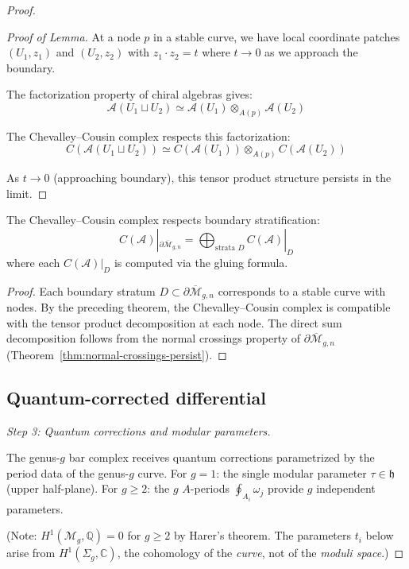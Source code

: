 \begin{proof}
\begin{proof}[Proof of Lemma]
At a node $p$ in a stable curve, we have local coordinate patches $(U_1, z_1)$ and
$(U_2, z_2)$ with $z_1 \cdot z_2 = t$ where $t \to 0$ as we approach the boundary.

The factorization property of chiral algebras gives:
\[\mathcal{A}(U_1 \sqcup U_2) \simeq \mathcal{A}(U_1) \otimes_{A(p)} \mathcal{A}(U_2)\]

The Chevalley--Cousin complex respects this factorization:
\[C(\mathcal{A}(U_1 \sqcup U_2)) \simeq C(\mathcal{A}(U_1)) \otimes_{A(p)} C(\mathcal{A}(U_2))\]

As $t \to 0$ (approaching boundary), this tensor product structure persists in the limit.
\end{proof}

\begin{corollary}\label{cor:CC-at-boundary}
The Chevalley--Cousin complex respects boundary stratification:
\[C(\mathcal{A})|_{\partial \overline{\mathcal{M}}_{g,n}} = \bigoplus_{\text{strata } D} C(\mathcal{A})|_D\]
where each $C(\mathcal{A})|_D$ is computed via the gluing formula.
\end{corollary}
\begin{proof}
Each boundary stratum $D \subset \partial\overline{\mathcal{M}}_{g,n}$ corresponds to a stable curve with nodes. By the preceding theorem, the Chevalley--Cousin complex is compatible with the tensor product decomposition at each node. The direct sum decomposition follows from the normal crossings property of $\partial\overline{\mathcal{M}}_{g,n}$ (Theorem~\ref{thm:normal-crossings-persist}).
\end{proof}

\subsection*{Quantum-corrected differential}

\emph{Step 3: Quantum corrections and modular parameters.}

The genus-$g$ bar complex receives quantum corrections parametrized by the
period data of the genus-$g$ curve. For $g=1$: the single modular parameter $\tau \in \mathfrak{h}$
(upper half-plane). For $g \geq 2$: the $g$ $A$-periods $\oint_{A_i}\omega_j$ provide
$g$ independent parameters.

(Note: $H^1(\mathcal{M}_g, \mathbb{Q}) = 0$ for $g \geq 2$ by Harer's theorem. The
parameters $t_i$ below arise from $H^1(\Sigma_g, \mathbb{C})$, the cohomology of the
\emph{curve}, not of the \emph{moduli space}.)


\end{proof}
